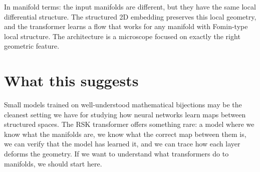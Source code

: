 \documentclass[11pt]{article}
\begin{document}
In manifold terms: the input manifolds are different, but they have
the same local differential structure. The structured 2D embedding
preserves this local geometry, and the transformer learns a flow that
works for any manifold with Fomin-type local structure. The
architecture is a microscope focused on exactly the right geometric
feature.

\section*{What this suggests}

Small models trained on well-understood mathematical bijections may be
the cleanest setting we have for studying how neural networks learn
maps between structured spaces. The RSK transformer offers something
rare: a model where we know what the manifolds are, we know what the
correct map between them is, we can verify that the model has learned
it, and we can trace how each layer deforms the geometry. If we want
to understand what transformers do to manifolds, we should start here.
\end{document}
